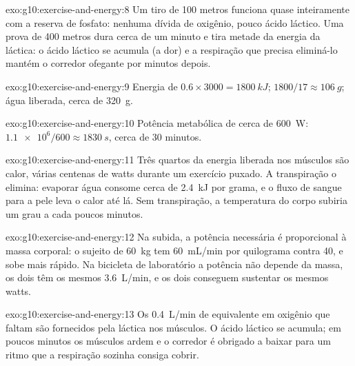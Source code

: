\begin{solution}{exo:g10:exercise-and-energy:8}
Um tiro de 100 metros funciona quase inteiramente com a reserva de
fosfato: nenhuma dívida de oxigênio, pouco ácido láctico. Uma prova de
400 metros dura cerca de um minuto e tira metade da energia da
 láctica: o ácido láctico se acumula (a dor) e a respiração
que precisa eliminá-lo mantém o corredor ofegante por minutos depois.
\end{solution}

\begin{solution}{exo:g10:exercise-and-energy:9}
Energia de  $0.6 \times 3000 = \qty{1800}{kJ}$; 
$1800/17 \approx \qty{106}{g}$; água liberada, cerca de \qty{320}{g}.
\end{solution}

\begin{solution}{exo:g10:exercise-and-energy:10}
Potência metabólica de cerca de \qty{600}{W}: $\num{1.1e6}/600 \approx
\qty{1830}{s}$, cerca de 30 minutos.
\end{solution}

\begin{solution}{exo:g10:exercise-and-energy:11}
Três quartos da energia liberada nos músculos são calor, várias
centenas de watts durante um exercício puxado. A transpiração o
elimina: evaporar água consome cerca de \qty{2.4}{kJ} por grama, e o
fluxo de sangue para a pele leva o calor até lá. Sem transpiração, a
temperatura do corpo subiria um grau a cada poucos minutos.
\end{solution}

\begin{solution}{exo:g10:exercise-and-energy:12}
Na subida, a potência necessária é proporcional à massa corporal: o
sujeito de \qty{60}{kg} tem \qty{60}{mL/min} por quilograma contra
\num{40}, e sobe mais rápido. Na bicicleta de laboratório a potência
não depende da massa, os dois têm os mesmos \qty{3.6}{L/min}, e os dois
conseguem sustentar os mesmos watts.
\end{solution}

\begin{solution}{exo:g10:exercise-and-energy:13}
Os \qty{0.4}{L/min} de equivalente em oxigênio que faltam são
fornecidos pela  láctica nos músculos. O ácido láctico se
acumula; em poucos minutos os músculos ardem e o corredor é obrigado a
baixar para um ritmo que a respiração sozinha consiga cobrir.
\end{solution}

